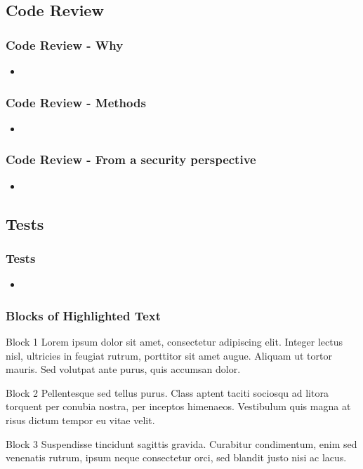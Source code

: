 \documentclass{beamer}
\begin{document}
\subsection{Code Review}
\begin{frame}
\frametitle{Code Review - Why}
\begin{itemize}
\item
\end{itemize}
\end{frame}
\begin{frame}
\frametitle{Code Review - Methods}
\begin{itemize}
\item
\end{itemize}
\end{frame}
\begin{frame}
\frametitle{Code Review - From a security perspective}
\begin{itemize}
\item
\end{itemize}
\end{frame}

\subsection{Tests}
\begin{frame}
\frametitle{Tests}
\begin{itemize}
\item
\end{itemize}
\end{frame}

\begin{frame}
\frametitle{Blocks of Highlighted Text}
\begin{block}{Block 1}
Lorem ipsum dolor sit amet, consectetur adipiscing elit. Integer lectus nisl, ultricies in feugiat rutrum, porttitor sit amet augue. Aliquam ut tortor mauris. Sed volutpat ante purus, quis accumsan dolor.
\end{block}

\begin{block}{Block 2}
Pellentesque sed tellus purus. Class aptent taciti sociosqu ad litora torquent per conubia nostra, per inceptos himenaeos. Vestibulum quis magna at risus dictum tempor eu vitae velit.
\end{block}

\begin{block}{Block 3}
Suspendisse tincidunt sagittis gravida. Curabitur condimentum, enim sed venenatis rutrum, ipsum neque consectetur orci, sed blandit justo nisi ac lacus.
\end{block}
\end{frame}
\end{document}
